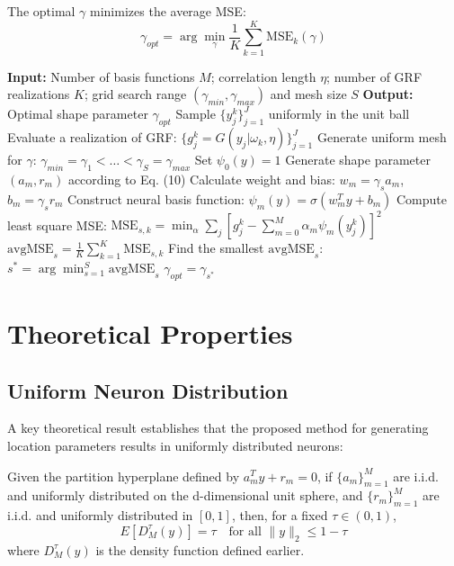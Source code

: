 \documentclass[11pt]{article}
\begin{document}
The optimal $\gamma$ minimizes the average MSE:
\begin{equation}
\gamma_{opt} = \arg \min_\gamma \frac{1}{K}\sum_{k=1}^K \text{MSE}_k(\gamma)
\end{equation}

\begin{algorithm}
\caption{Tuning shape parameter $\gamma$}
\begin{algorithmic}
\STATE \textbf{Input:} Number of basis functions $M$; correlation length $\eta$; number of GRF realizations $K$; grid search range $(\gamma_{min}, \gamma_{max})$ and mesh size $S$
\STATE \textbf{Output:} Optimal shape parameter $\gamma_{opt}$
\STATE Sample $\{y_j^k\}_{j=1}^J$ uniformly in the unit ball
\STATE Evaluate a realization of GRF: $\{g_j^k = G(y_j|\omega_k, \eta)\}_{j=1}^J$
\ENDFOR
\STATE Generate uniform mesh for $\gamma$: $\gamma_{min} = \gamma_1 < \ldots < \gamma_S = \gamma_{max}$
\STATE Set $\psi_0(y) = 1$
\STATE Generate shape parameter $(a_m, r_m)$ according to Eq. (10)
\STATE Calculate weight and bias: $w_m = \gamma_s a_m$, $b_m = \gamma_s r_m$
\STATE Construct neural basis function: $\psi_m(y) = \sigma(w_m^T y + b_m)$
\ENDFOR
\STATE Compute least square MSE: $\text{MSE}_{s,k} = \min_\alpha \sum_j [g_j^k - \sum_{m=0}^M \alpha_m \psi_m(y_j^k)]^2$
\ENDFOR
\STATE $\text{avgMSE}_s = \frac{1}{K}\sum_{k=1}^K \text{MSE}_{s,k}$
\ENDFOR
\STATE Find the smallest $\text{avgMSE}_s$: $s^* = \arg \min_{s=1}^S \text{avgMSE}_s$
\RETURN $\gamma_{opt} = \gamma_{s^*}$
\end{algorithmic}
\end{algorithm}

\section{Theoretical Properties}

\subsection{Uniform Neuron Distribution}

A key theoretical result establishes that the proposed method for generating location parameters results in uniformly distributed neurons:

\begin{theorem}
Given the partition hyperplane defined by $a_m^T y + r_m = 0$, if $\{a_m\}_{m=1}^M$ are i.i.d. and uniformly distributed on the d-dimensional unit sphere, and $\{r_m\}_{m=1}^M$ are i.i.d. and uniformly distributed in $[0, 1]$, then, for a fixed $\tau \in (0, 1)$,
\begin{equation}
E[D_M^\tau(y)] = \tau \quad \text{for all } \|y\|_2 \leq 1-\tau
\end{equation}
where $D_M^\tau(y)$ is the density function defined earlier.
\end{theorem}
\end{document}
